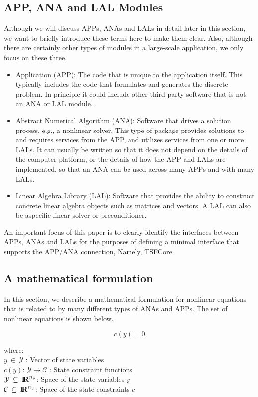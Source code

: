 \documentclass[10pt,fleqn]{article}
\begin{document}
%
\subsection{APP, ANA and LAL Modules}
\label{tsfcore:sec:module_overview}
Although we will discuss APPs, ANAs and LALs in detail later in this
section, we want to briefly introduce these terms here to make them
clear.  Also, although there are certainly other types of modules 
in a large-scale application, we only focus on these three.
\begin{itemize}
\item Application (APP):  The code that is unique to the application 
itself.  This typically includes the code that formulates and
generates the discrete problem.  In principle it could include other
third-party software that is not an ANA or LAL module.
\item Abstract Numerical Algorithm (ANA):  Software that drives a 
solution process, e.g., a nonlinear solver.  This type of package 
provides solutions to and requires services from
the APP, and utilizes services from one or more LALs.  It can usually 
be written so that
it does not depend on the details of the computer platform, or the
details of how the APP and LALs are implemented, so that an ANA
can be used across many APPs and with many LALs.
\item Linear Algebra Library (LAL): Software that provides the 
ability to construct
concrete linear algebra objects such as matrices and vectors.  
A LAL can also be aspecific linear solver or preconditioner.
\end{itemize}

An important focus of this paper is to clearly identify the interfaces 
between APPs, ANAs 
and LALs for the purposes of defining a minimal interface that 
supports the APP/ANA connection, Namely, TSFCore.

%

%
\subsection{A mathematical formulation}
\label{tsfcore:sec:math}
%

In this section, we describe a mathematical formulation for nonlinear
equations that is related to by many different types of ANAs and APPs.
The set of nonlinear equations is shown below.

{\bsinglespace
\begin{equation}
c(y)  = 0
\label{tsfcore:eqn:c}
\end{equation}
\begin{tabbing}
\hspace{\mathindent}where:\hspace{5ex}\= \\
\>	$y \:\in\:\mathcal{Y}$ : Vector of state variables \\
\>	$c(y) : \:\mathcal{Y} \rightarrow \mathcal{C}$ : State constraint functions \\
\>	$\mathcal{Y} \:\subseteq\:\mbox{\textbf{I}}\hspace{-0.6ex}\mbox{\textbf{R}}^{n_y}$: Space of the state variables $y$ \\
\>	$\mathcal{C} \:\subseteq\:\mbox{\textbf{I}}\hspace{-0.6ex}\mbox{\textbf{R}}^{n_y}$: Space of the state constraints $c$
\end{tabbing}
\esinglespace}
\end{document}
